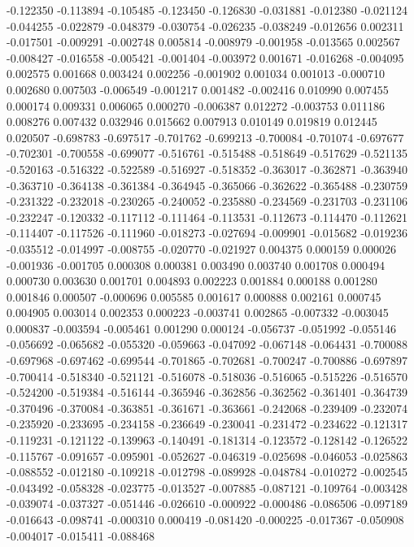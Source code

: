 -0.122350
-0.113894
-0.105485
-0.123450
-0.126830
-0.031881
-0.012380
-0.021124
-0.044255
-0.022879
-0.048379
-0.030754
-0.026235
-0.038249
-0.012656
0.002311
-0.017501
-0.009291
-0.002748
0.005814
-0.008979
-0.001958
-0.013565
0.002567
-0.008427
-0.016558
-0.005421
-0.001404
-0.003972
0.001671
-0.016268
-0.004095
0.002575
0.001668
0.003424
0.002256
-0.001902
0.001034
0.001013
-0.000710
0.002680
0.007503
-0.006549
-0.001217
0.001482
-0.002416
0.010990
0.007455
0.000174
0.009331
0.006065
0.000270
-0.006387
0.012272
-0.003753
0.011186
0.008276
0.007432
0.032946
0.015662
0.007913
0.010149
0.019819
0.012445
0.020507
-0.698783
-0.697517
-0.701762
-0.699213
-0.700084
-0.701074
-0.697677
-0.702301
-0.700558
-0.699077
-0.516761
-0.515488
-0.518649
-0.517629
-0.521135
-0.520163
-0.516322
-0.522589
-0.516927
-0.518352
-0.363017
-0.362871
-0.363940
-0.363710
-0.364138
-0.361384
-0.364945
-0.365066
-0.362622
-0.365488
-0.230759
-0.231322
-0.232018
-0.230265
-0.240052
-0.235880
-0.234569
-0.231703
-0.231106
-0.232247
-0.120332
-0.117112
-0.111464
-0.113531
-0.112673
-0.114470
-0.112621
-0.114407
-0.117526
-0.111960
-0.018273
-0.027694
-0.009901
-0.015682
-0.019236
-0.035512
-0.014997
-0.008755
-0.020770
-0.021927
0.004375
0.000159
0.000026
-0.001936
-0.001705
0.000308
0.000381
0.003490
0.003740
0.001708
0.000494
0.000730
0.003630
0.001701
0.004893
0.002223
0.001884
0.000188
0.001280
0.001846
0.000507
-0.000696
0.005585
0.001617
0.000888
0.002161
0.000745
0.004905
0.003014
0.002353
0.000223
-0.003741
0.002865
-0.007332
-0.003045
0.000837
-0.003594
-0.005461
0.001290
0.000124
-0.056737
-0.051992
-0.055146
-0.056692
-0.065682
-0.055320
-0.059663
-0.047092
-0.067148
-0.064431
-0.700088
-0.697968
-0.697462
-0.699544
-0.701865
-0.702681
-0.700247
-0.700886
-0.697897
-0.700414
-0.518340
-0.521121
-0.516078
-0.518036
-0.516065
-0.515226
-0.516570
-0.524200
-0.519384
-0.516144
-0.365946
-0.362856
-0.362562
-0.361401
-0.364739
-0.370496
-0.370084
-0.363851
-0.361671
-0.363661
-0.242068
-0.239409
-0.232074
-0.235920
-0.233695
-0.234158
-0.236649
-0.230041
-0.231472
-0.234622
-0.121317
-0.119231
-0.121122
-0.139963
-0.140491
-0.181314
-0.123572
-0.128142
-0.126522
-0.115767
-0.091657
-0.095901
-0.052627
-0.046319
-0.025698
-0.046053
-0.025863
-0.088552
-0.012180
-0.109218
-0.012798
-0.089928
-0.048784
-0.010272
-0.002545
-0.043492
-0.058328
-0.023775
-0.013527
-0.007885
-0.087121
-0.109764
-0.003428
-0.039074
-0.037327
-0.051446
-0.026610
-0.000922
-0.000486
-0.086506
-0.097189
-0.016643
-0.098741
-0.000310
0.000419
-0.081420
-0.000225
-0.017367
-0.050908
-0.004017
-0.015411
-0.088468
